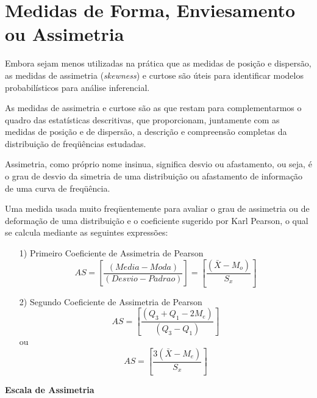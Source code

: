 \section{Medidas de Forma, Enviesamento ou Assimetria }

\inic Embora sejam menos utilizadas na prática que as medidas de posição e
dispersão, as medidas de assimetria (\textit{skewness}) e curtose são úteis para
identificar modelos probabilísticos para análise inferencial.

\inic As medidas de assimetria e curtose são as que restam para complementarmos o quadro das estatísticas descritivas, que proporcionam, juntamente com as medidas de posição e de dispersão, a descrição e compreensão completas da distribuição de freqüências estudadas.\vskip0.3cm

Assimetria, como próprio nome insinua, significa desvio ou afastamento, ou seja, é o grau de desvio da simetria de uma distribuição ou afastamento de informação de uma curva de freqüência.\vskip0.3cm





Uma medida usada muito freqüentemente para avaliar o grau de assimetria ou de deformação de uma distribuição e o coeficiente sugerido por Karl Pearson, o qual se calcula mediante as seguintes expressões:

\begin{enumerate}
  \item [{1)}]Primeiro Coeficiente de Assimetria de Pearson
  \begin{equation}\label{assimetria}
    AS = \left[ \frac{(Media-Moda)}{(Desvio-Padrao)} \right] = \left[  \frac{(\bar{X}-M_{o})}{S_{x}} \right]
\end{equation}
  \item [{2)}]Segundo Coeficiente de Assimetria de Pearson
  \begin{equation}\label{assimetria}
    AS = \left[ \frac{(Q_{3}+Q_{1}-2M_{e})}{(Q_{3}-Q_{1})} \right]
\end{equation}
    ou
 \begin{equation}
    AS = \left[ \frac{3(\bar{X}-M_{e})}{S_{x}} \right]
\end{equation}
\end{enumerate}






\textbf{Escala de Assimetria}

